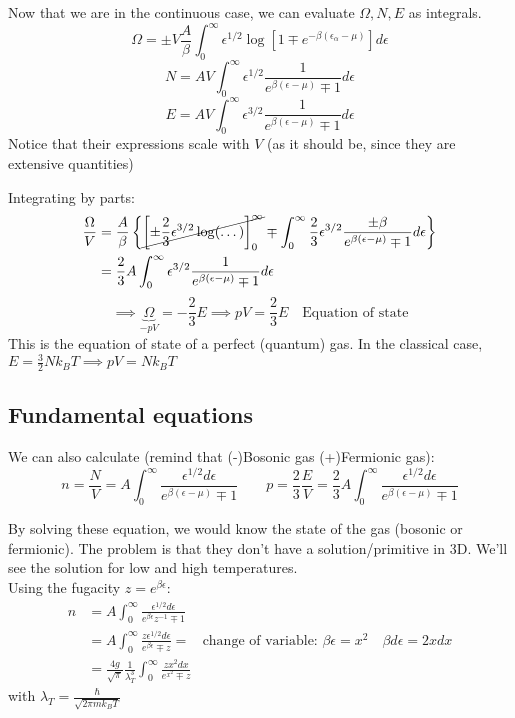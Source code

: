 Now that we are in the continuous case, we can evaluate $\Omega, N, E$ as integrals. 
$$ \Omega = \pm V\frac A\beta \int_0^\infty \epsilon^{1/2}\log \left[1 \mp e^{-\beta(\epsilon_\alpha - \mu)}\right]d\epsilon $$
\begin{equation}\label{eq:N-withA}
    N = AV\int_0^\infty \epsilon^{1/2}\frac1{e^{\beta(\epsilon - \mu)} \mp 1}d\epsilon
\end{equation}
\begin{equation}\label{eq:E-withA}
    E = AV\int_0^\infty \epsilon^{3/2}\frac1{e^{\beta(\epsilon - \mu)} \mp 1}d\epsilon
\end{equation}
Notice that their expressions scale with $V$ (as it should be, since they are extensive quantities)

Integrating by parts:
\begin{align*}
    \frac{\Omega}V &= \frac A\beta \left\{\cancel{\left[\pm \frac23 \epsilon^{3/2} \log(\dots)\right]_0^\infty} \mp \int_0^\infty \frac23 \epsilon^{3/2} \frac{\pm \beta}{e^{\beta(\epsilon-\mu)}\mp 1}d\epsilon\right\}\\
    &= \frac23 A \int_0^\infty \epsilon^{3/2} \frac1{e^{\beta(\epsilon-\mu)}\mp 1}d\epsilon
\end{align*}
$$ \implies \underbrace{\Omega}_{-pV} = -\frac23 E \implies \boxed{pV = \frac23 E} \quad \text{Equation of state}$$
This is the equation of state of a perfect (quantum) gas. In the classical case, $E = \frac32 Nk_BT \implies pV = Nk_BT$

\subsection{Fundamental equations}
We can also calculate (remind that (-)Bosonic gas   (+)Fermionic gas):
$$ n = \frac NV = A\int_0^\infty \frac{\epsilon^{1/2}d\epsilon}{e^{\beta(\epsilon-\mu)}\mp 1} \qquad p = \frac23 \frac EV = \frac23 A \int_0^\infty \frac{\epsilon^{1/2}d\epsilon}{e^{\beta(\epsilon-\mu)}\mp 1}$$

By solving these equation, we would know the state of the gas (bosonic or fermionic). The problem is that they don't have a solution/primitive in 3D. We'll see the solution for low and high temperatures.\\
Using the fugacity $z = e^{\beta \epsilon}$:
\begin{align*}
n &= A\int_0^\infty \frac{\epsilon^{1/2}d\epsilon}{e^{\beta\epsilon}z^{-1} \mp 1}\\
&= A\int_0^\infty \frac{z\epsilon^{1/2}d\epsilon}{e^{\beta\epsilon}\mp z} = &\text{change of variable: $\beta\epsilon = x^2 \quad \beta d\epsilon = 2xdx$}\\
&= \frac{4g}{\sqrt\pi}\frac1{\lambda_T^3}\int_0^\infty \frac{zx^2dx}{e^{x^2}\mp z}
\end{align*}
with $\lambda_T = \frac \hbar{\sqrt{2\pi mk_BT}}$

